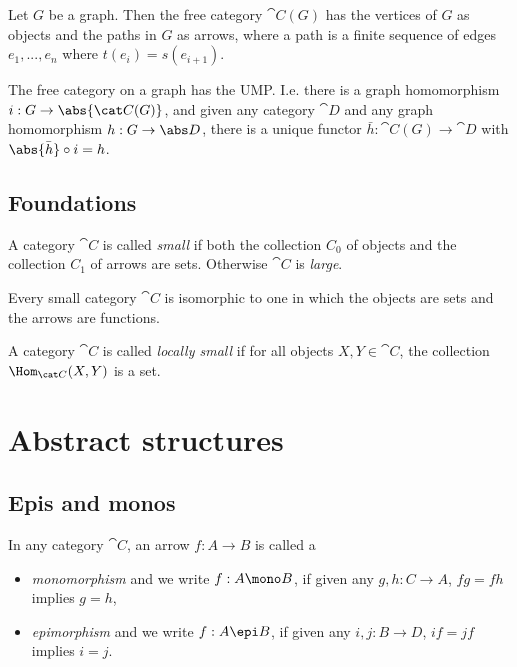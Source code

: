 \documentclass{article}
\begin{document}
\begin{definition}
    Let $G$ be a graph. Then the free category $\cat C(G)$ has the vertices
    of $G$ as objects and the paths in $G$ as arrows, where a path is a finite
    sequence of edges $e_1,...,e_n$ where $t(e_i)=s(e_{i+1})$.
\end{definition}

\begin{definition}
    The free category on a graph has the UMP. I.e. there is a graph
    homomorphism $i:G\to\abs{\cat C(G)}$, and given any category $\cat D$
    and any graph homomorphism $h:G\to\abs D$, there is a unique functor
    $\bar h:\cat C(G)\to \cat D$ with $\abs{\bar h}\circ i = h$.    
\end{definition}

\subsection{Foundations}

\begin{definition}[Awodey 1.11]
    A category $\cat C$ is called \emph{small} if both the collection $C_0$
    of objects and the collection $C_1$ of arrows are sets. Otherwise $\cat C$
    is \emph{large}.
\end{definition}

\begin{theorem}[Awodey 1.6]
    Every small category $\cat{C}$ is isomorphic
    to one in which the objects are sets and the arrows are functions.
\end{theorem}

\begin{definition}[Awodey 1.12]
    A category $\cat C$ is called \emph{locally small} if for all objects
    $X,Y\in\cat C$, the collection $\Hom_{\cat C}(X,Y)$ is a set.
\end{definition}

\section{Abstract structures}


\subsection{Epis and monos}

\begin{definition}[Awodey 2.1]
    In any category $\cat C$, an arrow $f:A\to B$ is called a
    \begin{itemize}
        \item \emph{monomorphism} and we write $f:A\mono B$, if given any $g,h:C\to A$, $fg=fh$ implies $g=h$,
        \item \emph{epimorphism} and we write $f:A\epi B$, if given any $i,j:B\to D$, $if=jf$ implies $i=j$. 
    \end{itemize}
\end{definition}
\end{document}
